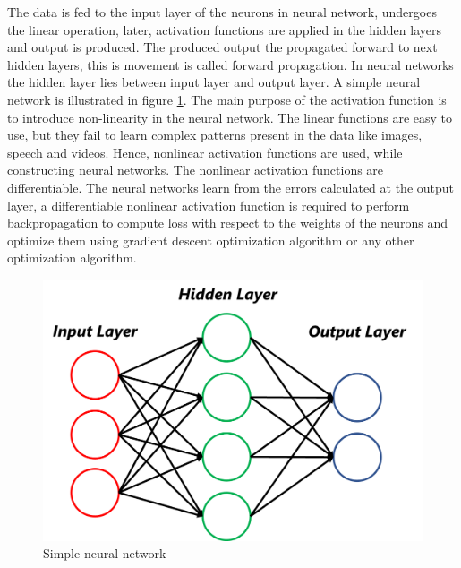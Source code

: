 The data is fed to the input layer of the neurons in neural network, undergoes the linear operation, later, activation functions are applied in the hidden layers and output is produced. The produced output the propagated forward to next hidden layers, this is movement is called forward propagation\footnotemark. In neural networks the hidden layer lies between input layer and output layer. A simple neural network is illustrated in figure \ref{fig:ann}. The main purpose of the activation function is to introduce non-linearity in the neural network. The linear functions are easy to use, but they fail to learn complex patterns present in the data like images, speech and videos. Hence, nonlinear activation functions are used, while constructing neural networks. The nonlinear activation functions are differentiable. The neural networks learn from the errors calculated at the output layer, a differentiable nonlinear activation function is required to perform backpropagation to compute loss with respect to the weights of the neurons and optimize them using gradient descent optimization algorithm or any other optimization algorithm. 


\begin{figure}[H]
        \begin{center}
	    \includegraphics[scale=0.30]{images/Fundamentals/ann.png}
	    \caption[Simple neural network.]{Simple neural network}
	    \label{fig:ann}
	    \end{center}
\end{figure}

